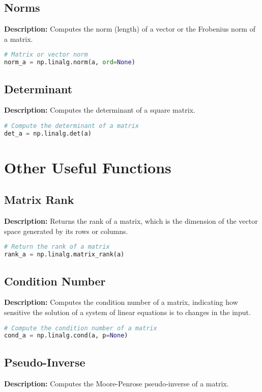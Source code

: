\documentclass[a4paper, 12pt]{article}
\begin{document}
\subsection{Norms}
\textbf{Description:} Computes the norm (length) of a vector or the Frobenius norm of a matrix.

\begin{lstlisting}[language=Python]
# Matrix or vector norm
norm_a = np.linalg.norm(a, ord=None)
\end{lstlisting}

\subsection{Determinant}
\textbf{Description:} Computes the determinant of a square matrix.

\begin{lstlisting}[language=Python]
# Compute the determinant of a matrix
det_a = np.linalg.det(a)
\end{lstlisting}

\section{Other Useful Functions}

\subsection{Matrix Rank}
\textbf{Description:} Returns the rank of a matrix, which is the dimension of the vector space generated by its rows or columns.

\begin{lstlisting}[language=Python]
# Return the rank of a matrix
rank_a = np.linalg.matrix_rank(a)
\end{lstlisting}

\subsection{Condition Number}
\textbf{Description:} Computes the condition number of a matrix, indicating how sensitive the solution of a system of linear equations is to changes in the input.

\begin{lstlisting}[language=Python]
# Compute the condition number of a matrix
cond_a = np.linalg.cond(a, p=None)
\end{lstlisting}

\subsection{Pseudo-Inverse}
\textbf{Description:} Computes the Moore-Penrose pseudo-inverse of a matrix.
\end{document}
